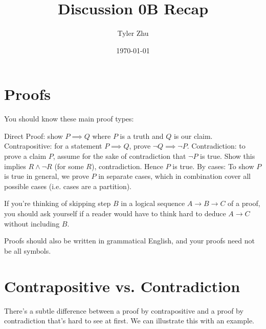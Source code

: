 \documentclass[11 pt]{scrartcl}
\newcommand{\hwtitle}{Discussion 0B Recap}
\begin{document}
 
\title{\Large \hwtitle{}}
\author{\large Tyler Zhu}
\date{\large\today}

\maketitle 

\section{Proofs}
You should know these main proof types:
\begin{itemize}
    \ii Direct Proof: show $P\implies Q$ where $P$ is a truth and $Q$ is our claim. 
    \ii Contrapositive: for a statement $P\implies Q$, prove $\neg Q \implies \neg P$. 
    \ii Contradiction: to prove a claim $P$, assume for the sake of contradiction that $\neg P$ is true. Show this implies $R\wedge \neg R$ (for some $R$), contradiction. Hence $P$ is true. 
    \ii By cases: To show $P$ is true in general, we prove $P$ in separate cases, which in combination cover all possible cases (i.e. cases are a partition). 
\end{itemize}

If you're thinking of skipping step $B$ in a logical sequence $A\to B\to C$ of a proof, you should ask yourself if a reader would have to think hard to deduce $A\to C$ without including $B$. 

Proofs should also be written in grammatical English, and your proofs need not be all symbols.

\section{Contrapositive vs. Contradiction}
There's a subtle difference between a proof by contrapositive and a proof by contradiction that's hard to see at first. We can illustrate this with an example. 
\end{document}
